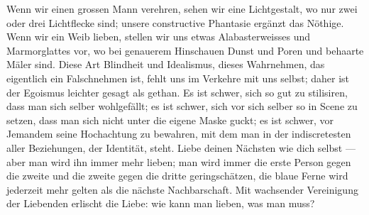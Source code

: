 Wenn wir einen grossen Mann verehren, sehen wir eine Lichtgestalt, wo nur zwei oder drei Lichtflecke sind; unsere constructive Phantasie ergänzt das Nöthige. Wenn wir ein Weib lieben, stellen wir uns etwas Alabasterweisses und Marmorglattes vor, wo bei genauerem Hinschauen Dunst und Poren und behaarte Mäler sind. Diese Art Blindheit und Idealismus, dieses Wahrnehmen, das eigentlich ein Falschnehmen ist, fehlt uns im Verkehre mit uns selbst; daher ist der Egoismus leichter gesagt als gethan. Es ist schwer, sich so gut zu stilisiren, dass man sich selber wohlgefällt; es ist schwer, sich vor sich selber so in Scene zu setzen, dass man sich nicht unter die eigene Maske guckt; es ist schwer, vor Jemandem seine Hochachtung zu bewahren, mit dem man in der indiscretesten aller Beziehungen, der Identität, steht. Liebe deinen Nächsten wie dich selbst — aber man wird ihn immer mehr lieben; man wird immer die erste Person gegen die zweite und die zweite gegen die dritte geringschätzen, die blaue Ferne wird jederzeit mehr gelten als die nächste Nachbarschaft. Mit wachsender Vereinigung der Liebenden erlischt die Liebe: wie kann man lieben, was man  muss?
\par

